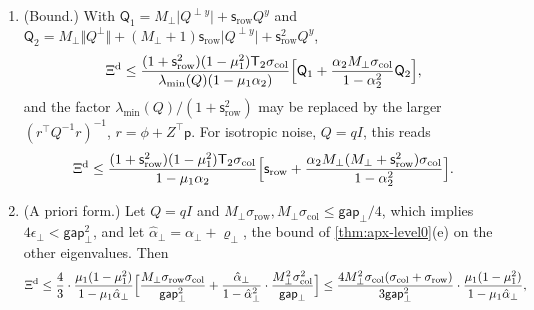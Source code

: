 \begin{theorem}
\begin{enumerate}
\begin{equation}\label{eq:apx-markov-cascade}
\tilde x_{t+1}=A_2\tilde x_t+\mathsf G\mathfrak n_t,\qquad y_{t+1}=\mu_1y_t+A_{y\perp}\tilde x_t+\phi^\top\mathfrak n_t .
\end{equation}
With $\Sigma_{\tilde x}=\Cov(\tilde x_t)$, the solution of $\Sigma_{\tilde x}=A_2\Sigma_{\tilde x}A_2^\top+\mathsf GQ\mathsf G^\top$, and $\Sigma_{\tilde xy}=\Cov(\tilde x_t,y_t)$, for every $u\ge0$
\begin{equation}\label{eq:apx-markov-identity}
\Corr(y_t,y_{t+u})-\mu_1^u=\frac1{\Sigma_y}\sum_{s=0}^{u-1}\mu_1^{u-1-s}A_{y\perp}A_2^s\Sigma_{\tilde xy},\qquad\Sigma_{\tilde xy}=(I-\mu_1A_2)^{-1}\bigl(\mathsf GQ\phi+A_2\Sigma_{\tilde x}A_{y\perp}^\top\bigr).
\end{equation}
\item[(b)] (Bound.) With $\mathsf Q_1=M_\perp\lvert Q^{\perp y}\rvert+\mathsf s_{\mathrm{row}}Q^y$ and $\mathsf Q_2=M_\perp\Vert Q^\perp\Vert+(M_\perp+1)\mathsf s_{\mathrm{row}}\lvert Q^{\perp y}\rvert+\mathsf s_{\mathrm{row}}^2Q^y$,
\begin{equation}\label{eq:apx-markov-bound}
\Xi^{\mathrm d}\le\frac{(1+\mathsf s_{\mathrm{row}}^2)(1-\mu_1^2)\mathsf T_2\sigma_{\mathrm{col}}}{\lambda_{\min}(Q)(1-\mu_1\alpha_2)}\Bigl[\mathsf Q_1+\frac{\alpha_2M_\perp\sigma_{\mathrm{col}}}{1-\alpha_2^2}\mathsf Q_2\Bigr],
\end{equation}
and the factor $\lambda_{\min}(Q)/(1+\mathsf s_{\mathrm{row}}^2)$ may be replaced by the larger $(r^\top Q^{-1}r)^{-1}$, $r=\phi+Z^\top\mathsf p$. For isotropic noise, $Q=qI$, this reads
\begin{equation}\label{eq:apx-markov-iso}
\Xi^{\mathrm d}\le\frac{(1+\mathsf s_{\mathrm{row}}^2)(1-\mu_1^2)\mathsf T_2\sigma_{\mathrm{col}}}{1-\mu_1\alpha_2}\Bigl[\mathsf s_{\mathrm{row}}+\frac{\alpha_2M_\perp(M_\perp+\mathsf s_{\mathrm{row}}^2)\sigma_{\mathrm{col}}}{1-\alpha_2^2}\Bigr].
\end{equation}
\item[(c)] (A priori form.) Let $Q=qI$ and $M_\perp\sigma_{\mathrm{row}},M_\perp\sigma_{\mathrm{col}}\le\mathsf{gap}_\perp/4$, which implies $4\epsilon_\perp<\mathsf{gap}_\perp^2$, and let $\hat\alpha_\perp=\alpha_\perp+\varrho_\perp$, the bound of \cref{thm:apx-level0}(e) on the other eigenvalues. Then
\begin{equation}\label{eq:apx-markov-apriori}
\Xi^{\mathrm d}\le\frac43\cdot\frac{\mu_1(1-\mu_1^2)}{1-\mu_1\hat\alpha_\perp}\Bigl[\frac{M_\perp\sigma_{\mathrm{row}}\sigma_{\mathrm{col}}}{\mathsf{gap}_\perp^2}+\frac{\hat\alpha_\perp}{1-\hat\alpha_\perp^2}\cdot\frac{M_\perp^2\sigma_{\mathrm{col}}^2}{\mathsf{gap}_\perp}\Bigr]\le\frac{4M_\perp^2\sigma_{\mathrm{col}}(\sigma_{\mathrm{col}}+\sigma_{\mathrm{row}})}{3\mathsf{gap}_\perp^2}\cdot\frac{\mu_1(1-\mu_1^2)}{1-\mu_1\hat\alpha_\perp},

\end{equation}
\end{enumerate}
\end{theorem}
